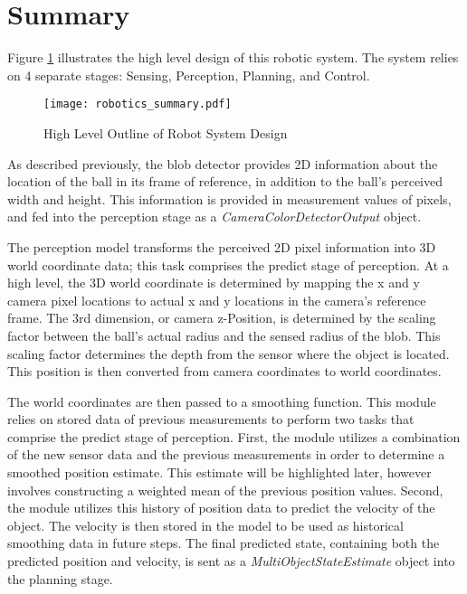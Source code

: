 \documentclass{article}
\begin{document}
\section{Summary}

Figure \ref{fig:summary} illustrates the high level design of this robotic system. The system relies on 4 separate stages: Sensing, Perception, Planning, and Control. \par 

\begin{figure}[htb!]
\begin{center}
\texttt{[image: robotics\_summary.pdf]}
\caption{\label{fig:summary} High Level Outline of Robot System Design}
\end{center}
\end{figure}

As described previously, the blob detector provides 2D information about the location of the ball in its frame of reference, in addition to the ball's perceived width and height. This information is provided in measurement values of pixels, and fed into the perception stage as a \emph{CameraColorDetectorOutput} object. \par

The perception model transforms the perceived 2D pixel information into 3D world coordinate data; this task comprises the predict stage of perception. At a high level, the 3D world coordinate is determined by mapping the x and y camera pixel locations to actual x and y locations in the camera's reference frame. The 3rd dimension, or camera z-Position, is determined by the scaling factor between the ball's actual radius and the sensed radius of the blob. This scaling factor determines the depth from the sensor where the object is located. This position is then converted from camera coordinates to world coordinates. \par 

The world coordinates are then passed to a smoothing function. This module relies on stored data of previous measurements to perform two tasks that comprise the predict stage of perception. First, the module utilizes a combination of the new sensor data and the previous measurements in order to determine a smoothed position estimate. This estimate will be highlighted later, however involves constructing a weighted mean of the previous position values. Second, the module utilizes this history of position data to predict the velocity of the object. The velocity is then stored in the model to be used as historical smoothing data in future steps. The final predicted state, containing both the predicted position and velocity, is sent as a \emph{MultiObjectStateEstimate} object into the planning stage.
\end{document}
